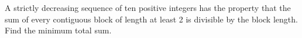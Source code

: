 A strictly decreasing sequence of ten positive integers has the property that the sum of every contiguous block of length at least 2 is divisible by the block length. Find the minimum total sum.
